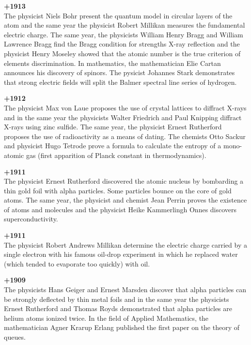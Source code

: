 \textbf{+1913}\\
The physicist Niels Bohr present the quantum model in circular layers of the atom and the same year the physicist Robert Millikan measures the fundamental electric charge. The same year, the physicists William Henry Bragg and William Lawrence Bragg find the Bragg condition for strengths X-ray reflection and the physicist Henry Moseley showed that the atomic number is the true criterion of elements discrimination. In mathematics, the mathematician Elie Cartan announces his discovery of spinors. The pysicist Johannes Stark demonstrates that strong electric fields will split the Balmer spectral line series of hydrogen.

\textbf{+1912}\\
The physicist Max von Laue proposes the use of crystal lattices to diffract X-rays and in the same year the physicists Walter Friedrich and Paul Knipping diffract X-rays using zinc sulfide. The same year, the physicist Ernest Rutherford proposes the use of radioactivity as a means of dating. The chemists Otto Sackur and physicist Hugo Tetrode prove a formula to calculate the entropy of a mono-atomic gas (first apparition of Planck constant in thermodynamics).

\textbf{+1911}\\
The physicist Ernest Rutherford discovered the atomic nucleus by bombarding a thin gold foil with alpha particles. Some particles bounce on the core of gold atoms. The same year, the physicist and chemist Jean Perrin proves the existence of atoms and molecules and the physicist Heike Kammerlingh Onnes discovers superconductivity.

\textbf{+1911}\\
The physicist Robert Andrews Millikan determine the electric charge carried by a single electron with his famous oil-drop experiment in which he replaced water (which tended to evaporate too quickly) with oil.

\textbf{+1909}\\
The physicists Hans Geiger and Ernest Marsden discover that alpha particles can be strongly deflected by thin metal foils and in the same year the physicists Ernest Rutherford and Thomas Royds demonstrated that alpha particles are helium atoms ionized twice. In the field of Applied Mathematics, the mathematician Agner Krarup Erlang published the first paper on the theory of queues. 


